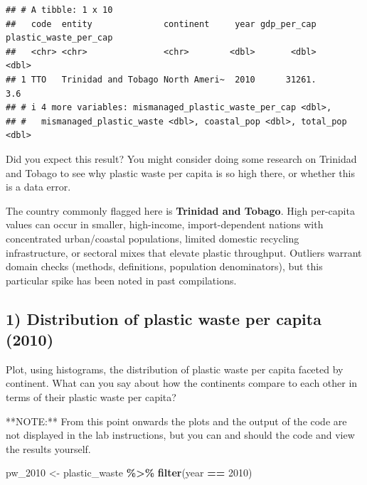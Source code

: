 \documentclass[
]{article}
\newenvironment{Shaded}{\begin{snugshade}}{\end{snugshade}}
\newcommand{\DecValTok}[1]{\textcolor[rgb]{0.00,0.00,0.81}{#1}}
\newcommand{\FunctionTok}[1]{\textcolor[rgb]{0.13,0.29,0.53}{\textbf{#1}}}
\newcommand{\NormalTok}[1]{#1}
\newcommand{\OtherTok}[1]{\textcolor[rgb]{0.56,0.35,0.01}{#1}}
\newcommand{\SpecialCharTok}[1]{\textcolor[rgb]{0.81,0.36,0.00}{\textbf{#1}}}
\begin{document}
\begin{verbatim}
## # A tibble: 1 x 10
##   code  entity              continent     year gdp_per_cap plastic_waste_per_cap
##   <chr> <chr>               <chr>        <dbl>       <dbl>                 <dbl>
## 1 TTO   Trinidad and Tobago North Ameri~  2010      31261.                   3.6
## # i 4 more variables: mismanaged_plastic_waste_per_cap <dbl>,
## #   mismanaged_plastic_waste <dbl>, coastal_pop <dbl>, total_pop <dbl>
\end{verbatim}

Did you expect this result? You might consider doing some research on
Trinidad and Tobago to see why plastic waste per capita is so high
there, or whether this is a data error.

The country commonly flagged here is \textbf{Trinidad and Tobago}. High
per-capita values can occur in smaller, high-income, import-dependent
nations with concentrated urban/coastal populations, limited domestic
recycling infrastructure, or sectoral mixes that elevate plastic
throughput. Outliers warrant domain checks (methods, definitions,
population denominators), but this particular spike has been noted in
past compilations.

\subsection{1) Distribution of plastic waste per capita
(2010)}\label{distribution-of-plastic-waste-per-capita-2010}

Plot, using histograms, the distribution of plastic waste per capita
faceted by continent. What can you say about how the continents compare
to each other in terms of their plastic waste per capita?

\begin{Shaded}
\begin{Highlighting}[]
\NormalTok{**NOTE:** From this point onwards the plots and the output of the code are not displayed in the lab instructions, but you can and should the code and view the results yourself.}
\end{Highlighting}
\end{Shaded}

\begin{Shaded}
\begin{Highlighting}[]
\NormalTok{pw\_2010 }\OtherTok{\textless{}{-}}\NormalTok{ plastic\_waste }\SpecialCharTok{\%\textgreater{}\%} \FunctionTok{filter}\NormalTok{(year }\SpecialCharTok{==} \DecValTok{2010}\NormalTok{)}
\end{Highlighting}
\end{Shaded}
\end{document}
